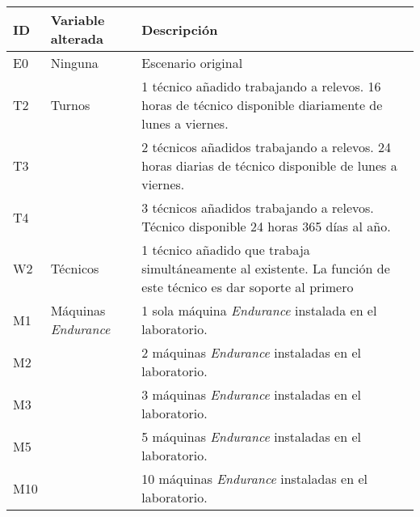 \documentclass[varwidth=\maxdimen]{standalone}
\begin{document}
\begin{tabularx}{\textwidth}{ l l X }
	\toprule
	ID & Variable alterada	& Descripción \\
	\midrule
	E0	& Ninguna	& Escenario original\\
	\addlinespace
	T2	& Turnos	& 1 técnico añadido trabajando a relevos. 16 horas de técnico disponible diariamente de lunes a viernes. \\
	T3	&			& 2 técnicos añadidos trabajando a relevos. 24 horas diarias de técnico disponible de lunes a viernes. \\
	T4	&			& 3 técnicos añadidos trabajando a relevos. Técnico disponible 24 horas 365 días al año. \\
	\addlinespace
	W2	& Técnicos	& 1 técnico añadido que trabaja simultáneamente al existente. La función de este técnico es dar soporte al primero \\
	\addlinespace
	M1	& Máquinas \textit{Endurance} & 1 sola máquina \textit{Endurance} instalada en el laboratorio. \\
	M2	&  			& 2 máquinas \textit{Endurance} instaladas en el laboratorio. \\
	M3	& 			& 3 máquinas \textit{Endurance} instaladas en el laboratorio. \\
	M5	& 			& 5 máquinas \textit{Endurance} instaladas en el laboratorio. \\
	M10	& 			& 10 máquinas \textit{Endurance} instaladas en el laboratorio. \\
	\bottomrule
\end{tabularx}
\end{document}
